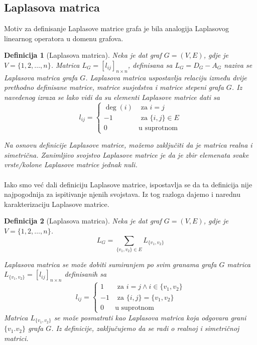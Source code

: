 \documentclass[11pt]{article}
\newtheorem{definition}{Definicija}
\begin{document}
		\subsection{Laplasova matrica}
			Motiv za definisanje Laplasove matrice grafa je bila analogija Laplasovog linearnog operatora u domenu grafova.

			\begin{definition}[Laplasova matrica] 
			Neka je dat graf $G = (V, E)$, gdje je $V = \{1, 2, \dots, n\}$. Matrica $L_G = [l_{ij}]_{n \times n}$, definisana sa $L_G = D_G - A_G$ naziva se Laplasova matrica grafa $G$.
			Laplasova matrica uspostavlja relaciju između dvije prethodno definisane matrice, matrice susjedstva i matrice stepeni grafa $G$.
			Iz navedenog izraza se lako vidi da su elementi Laplasove matrice dati sa
			 \[
				 l_{ij} =
				 \begin{cases}
				 \deg(i)  & \text{ za } i = j \\
				 -1 & \text{ za } \{i, j\} \in E \\ 
				 0  & \text{u suprotnom}
				 \end{cases}
			 \]
			
			Na osnovu definicije Laplasove matrice, možemo zaključiti da je matrica realna i simetrična.
			Zanimljivo svojstvo Laplasove matrice je da je zbir elemenata svake vrste/kolone Laplasove matrice jednak nuli.
			\end{definition}
	
			\paragraph{}
			Iako smo već dali definiciju Laplasove matrice, ispostavlja se da ta definicija nije najpogodnija za ispitivanje njenih svojstava. Iz tog razloga dajemo i narednu karakterizaciju Laplasove matrice.
	
			\begin{definition}[Laplasova matrica]
			Neka je dat graf $G = (V, E)$, gdje je $V = \{1, 2, \dots, n\}$. 
			\[
				L_G = \sum_{\{v_1,v_2\} \in E} L_{\{v_1,v_2\}}
			\] 
			
			Laplasova matrica se može dobiti sumiranjem po svim granama grafa $G$ matrica $L_{\{v_1,v_2\}} = [l_{ij}]_{n \times n}$ definisanih sa
			\[
				 l_{ij} =
				 \begin{cases}
				 1  & \text{ za } i = j  \land i \in \{v_1,v_2\} \\
				 -1 & \text{ za } \{i,j\} = \{v_1,v_2\} \\ 
				 0  & \text{u suprotnom}
				 \end{cases}
			 \]
			Matrica $L_{\{v_1,v_2\}}$ se može posmatrati kao Laplasova matrica koja odgovara grani $\{v_1.v_2\}$ grafa $G$. Iz definicije, zaključujemo da se radi o realnoj i simetričnoj matrici.
			\end{definition}
			
\end{document}
